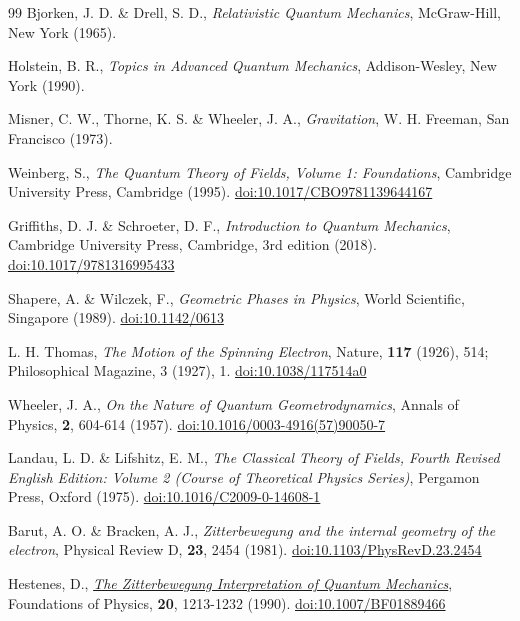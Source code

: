 \documentclass[%
 reprint,
 amsmath,amssymb,
 aps,
]{revtex4-1}
\numberwithin{equation}{section}%
\begin{document}
\begin{thebibliography}{99}
Bjorken, J. D. \& Drell, S. D.,
\textit{Relativistic Quantum Mechanics},
McGraw-Hill, New York (1965).

Holstein, B. R.,
\textit{Topics in Advanced Quantum Mechanics},
Addison-Wesley, New York (1990).

Misner, C. W., Thorne, K. S. \& Wheeler, J. A.,
\textit{Gravitation},
W. H. Freeman, San Francisco (1973).

Weinberg, S.,
\textit{The Quantum Theory of Fields, Volume 1: Foundations},
Cambridge University Press, Cambridge (1995).
\href{https://doi.org/10.1017/CBO9781139644167}{doi:10.1017/CBO9781139644167}

Griffiths, D. J. \& Schroeter, D. F.,
\textit{Introduction to Quantum Mechanics},
Cambridge University Press, Cambridge, 3rd edition (2018).
\href{https://doi.org/10.1017/9781316995433}{doi:10.1017/9781316995433}

Shapere, A. \& Wilczek, F.,
\textit{Geometric Phases in Physics},
World Scientific, Singapore (1989).
\href{https://doi.org/10.1142/0613}{doi:10.1142/0613}

L. H. Thomas,
\textit{The Motion of the Spinning Electron},
Nature, \textbf{117} (1926), 514;
Philosophical Magazine, 3 (1927), 1.
\href{https://doi.org/10.1038/117514a0}{doi:10.1038/117514a0}

Wheeler, J. A.,
\textit{On the Nature of Quantum Geometrodynamics},
Annals of Physics,
\textbf{2}, 604-614 (1957).
\href{https://doi.org/10.1016/0003-4916(57)90050-7}{doi:10.1016/0003-4916(57)90050-7}

Landau, L. D. \& Lifshitz, E. M.,
\textit{The Classical Theory of Fields, Fourth Revised English Edition: Volume 2 (Course of Theoretical Physics Series)},
Pergamon Press, Oxford (1975).
\href{https://doi.org/10.1016/C2009-0-14608-1}{doi:10.1016/C2009-0-14608-1}

Barut, A. O. \& Bracken, A. J.,
\textit{Zitterbewegung and the internal geometry of the electron},
Physical Review D,
\textbf{23}, 2454 (1981).
\href{https://doi.org/10.1103/PhysRevD.23.2454}{doi:10.1103/PhysRevD.23.2454}

Hestenes, D.,
\href{https://davidhestenes.net/geocalc/pdf/ZBW_I_QM.pdf}{\textit{The Zitterbewegung Interpretation of Quantum Mechanics}},
Foundations of Physics, 
\textbf{20}, 1213-1232 (1990).
\href{https://doi.org/10.1007/BF01889466}{doi:10.1007/BF01889466}


\end{thebibliography}
\end{document}
